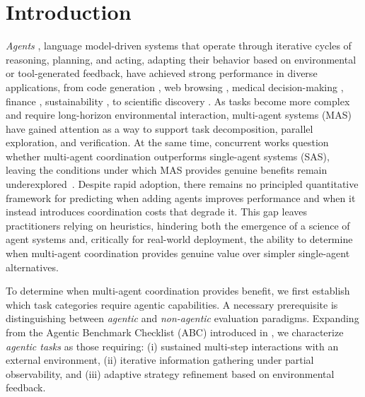 \section{Introduction}
\vspace{-0.1cm}

\textit{Agents} \citep{wang2024survey}, language model-driven systems that operate through iterative cycles of reasoning, planning, and acting, adapting their behavior based on environmental or tool-generated feedback, have achieved strong performance in diverse applications, from code generation \citep{zhang2024codeagent, yang2024swe}, web browsing \citep{wei2025browsecomp, yao2022webshop}, medical decision-making \citep{heydari2025anatomy, mcduff2025towards, kim2024mdagents}, finance \citep{yu2025finmem}, sustainability \citep{zhang2025towards}, to scientific discovery \citep{gottweis2025towards, mitchener2025kosmos}. As tasks become more complex and require long-horizon environmental interaction, multi-agent systems (MAS) have gained attention as a way to support task decomposition, parallel exploration, and verification. At the same time, concurrent works question whether multi-agent coordination outperforms single-agent systems (SAS), leaving the conditions under which MAS provides genuine benefits remain underexplored~\citep{tran2025multiagent,guo2024large, cemri2025multi,gao2025single,openhands2025single,cognition2025multi}. Despite rapid adoption, there remains no principled quantitative framework for predicting when adding agents improves performance and when it instead introduces coordination costs that degrade it. This gap leaves practitioners relying on heuristics, hindering both the emergence of a science of agent systems and, critically for real-world deployment, the ability to determine when multi-agent coordination provides genuine value over simpler single-agent alternatives.

To determine when multi-agent coordination provides benefit, we first establish which task categories require agentic capabilities. 
A necessary prerequisite is distinguishing between \textit{agentic} and \textit{non-agentic} evaluation paradigms. Expanding from the Agentic Benchmark Checklist (ABC) introduced in \citep{zhu2025establishing}, we characterize \textit{agentic tasks} as those requiring: (i) sustained multi-step interactions with an external environment, (ii) iterative information gathering under partial observability, and (iii) adaptive strategy refinement based on environmental feedback.

